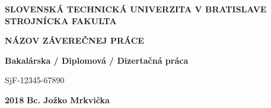 \renewcommand\thepage{\roman{page}}
\thispagestyle{empty}

\noindent \begin{center}
	\textbf{{\large{}SLOVENSKÁ TECHNICKÁ UNIVERZITA V BRATISLAVE}}\\
	\textbf{{\large{}STROJNÍCKA FAKULTA}}\textbf{\large{} }\\
	\vspace{3cm}
	\par\end{center}

\noindent \begin{center}
	\vspace{3cm}
	\par\end{center}



\begin{center}
	\textbf{\textsc{\Large{}NÁZOV ZÁVEREČNEJ PRÁCE}}\\
	\par\end{center}{\Large \par}

\begin{center}
	\textbf{\large{}Bakalárska / Diplomová / Dizertačná práca}\\
	\par\end{center}{\large \par}

\begin{center}
	{\large{}SjF-12345-67890}\\
	\par\end{center}{\large \par}



\vfill
\noindent \textbf{\large{}2018} \hfill \textbf{\large{}Bc. Jožko Mrkvička}
\cleardoublepage